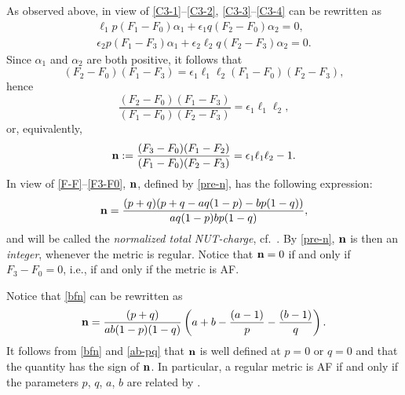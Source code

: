 \documentclass[10pt,a4paper]{amsart}
\numberwithin{equation}{section}
\begin{document}
As observed above, in view of \eqref{C3-1}--\eqref{C3-2}, \eqref{C3-3}--\eqref{C3-4} can be rewritten as
\begin{gather} \ell _1 p (F_1 - F_0) \alpha _1 + \epsilon _1 q (F_2 - F_0) \alpha _2= 0, \label{C3-3bis}\\
\epsilon _2 p (F_1 - F_3) \alpha _1 + \epsilon _2 \ell _2 q (F_2 - F_3) \alpha _2 = 0. \label{C3-4bis}
\end{gather}
Since $\alpha _1$ and $\alpha _2$ are both positive, it follows that
\[(F_2 - F_0) (F_1 - F_3) = \epsilon _1 \ell _1 \ell _2 (F_1 - F_0) (F_2 - F_3), \]
hence
\[ \frac{(F_2 - F_0) (F_1 - F_3)}{(F_1 - F _0) (F _2 - F_3)} = \epsilon _1 \ell _1 \ell _2, \]
or, equivalently,
\begin{gather} \label{pre-n} {\bf n} := \frac{(F_3 - F_0) (F_1 - F_2)}{(F_1 - F _0) (F _2 - F_3)} = \epsilon _1 \ell _1 \ell _2 - 1. \end{gather}
In view of \eqref{F-F}--\eqref{F3-F0}, ${\bf n}$, defined by \eqref{pre-n}, has the following expression:
\begin{gather} \label{bfn} {\bf n} = \frac{(p + q) (p + q - a q (1 - p) - b p (1 - q))}{a q (1 - p) b p (1 - q)}, \end{gather}
and will be called the {\it normalized total NUT-charge}, cf.\ \cite[Section~III.B]{CT3}. By \eqref{pre-n}, ${\bf n}$ is then an {\it integer}, whenever the metric is regular. Notice that ${\bf n} = 0$ if and only if $F _3 - F _0 = 0$, i.e., if and only if the metric is AF.
\begin{rem} \label{rem-ab} {\rm Notice that \eqref{bfn} can be rewritten as
\[{\bf n} = \frac{(p + q)}{a b (1 - p) (1 - q)} \left(a + b - \frac{(a - 1)}{p} - \frac{(b - 1)}{q}\right).\]
 It follows from \eqref{bfn} and \eqref{ab-pq} that ${\bf n}$ is well defined at $p = 0$ or $q = 0$ and that the quantity  has the sign of ${\bf n}$. In particular, a regular metric is AF if and only if the parameters $p$, $q$, $a$, $b$ are related by .
} \end{rem}
\end{document}
